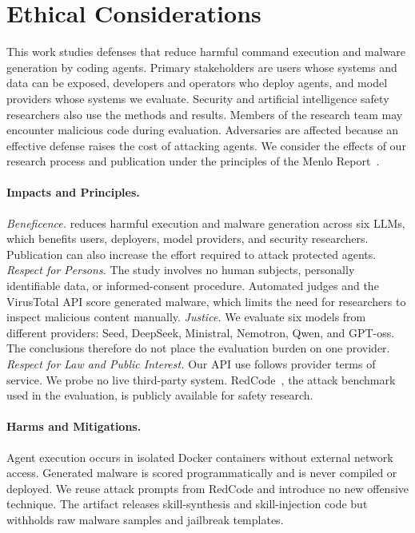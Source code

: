 \section*{Ethical Considerations}
\label{app:ethics}

This work studies defenses that reduce harmful command execution and malware generation by coding agents. Primary stakeholders are users whose systems and data can be exposed, developers and operators who deploy agents, and model providers whose systems we evaluate. Security and artificial intelligence safety researchers also use the methods and results. Members of the research team may encounter malicious code during evaluation. Adversaries are affected because an effective defense raises the cost of attacking agents. We consider the effects of our research process and publication under the principles of the Menlo Report~\cite{kenneally2012menlo}.

\paragraph{Impacts and Principles.}
\emph{Beneficence.}
\sysname reduces harmful execution and malware generation across six LLMs, which benefits users, deployers, model providers, and security researchers. Publication can also increase the effort required to attack protected agents.
\emph{Respect for Persons.}
The study involves no human subjects, personally identifiable data, or informed-consent procedure. Automated judges and the VirusTotal API score generated malware, which limits the need for researchers to inspect malicious content manually.
\emph{Justice.}
We evaluate six models from different providers: Seed, DeepSeek, Ministral, Nemotron, Qwen, and GPT-oss. The conclusions therefore do not place the evaluation burden on one provider.
\emph{Respect for Law and Public Interest.}
Our API use follows provider terms of service. We probe no live third-party system. RedCode~\cite{guo2024redcode}, the attack benchmark used in the evaluation, is publicly available for safety research.

\paragraph{Harms and Mitigations.}
Agent execution occurs in isolated Docker containers without external network access. Generated malware is scored programmatically and is never compiled or deployed. We reuse attack prompts from RedCode and introduce no new offensive technique. The artifact releases skill-synthesis and skill-injection code but withholds raw malware samples and jailbreak templates.

